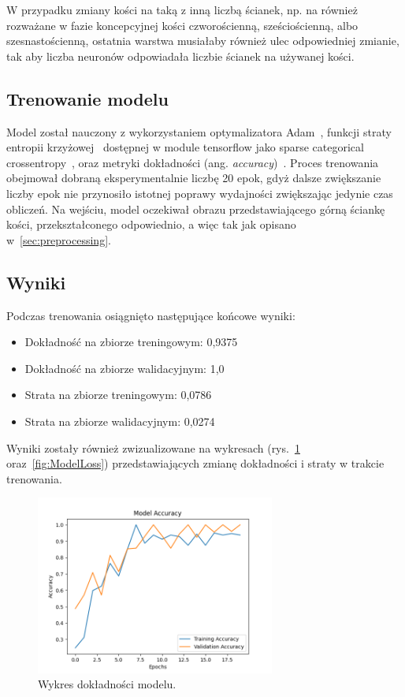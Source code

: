 W przypadku zmiany kości na taką z inną liczbą ścianek, np.
na również rozważane w fazie koncepcyjnej kości czworościenną, sześciościenną, albo szesnastościenną,
ostatnia warstwa musiałaby również ulec odpowiedniej zmianie,
tak aby liczba neuronów odpowiadała liczbie ścianek na używanej kości.

\subsection{Trenowanie modelu}\label{subsec:trenowanie-modelu}

Model został nauczony z wykorzystaniem optymalizatora Adam~\cite{kingma2014adam, keras_adam},
funkcji straty entropii krzyżowej~\cite{crossentropy} dostępnej w module tensorflow jako sparse categorical crossentropy~\cite{tensorflow_loss},
oraz metryki dokładności (ang. \textit{accuracy})~\cite{tensorflow_accuracy}.
Proces trenowania obejmował dobraną eksperymentalnie liczbę 20 epok, gdyż dalsze zwiększanie liczby epok nie przynosiło istotnej poprawy wydajności zwiększając jedynie czas obliczeń.
Na wejściu, model oczekiwał obrazu przedstawiającego górną ściankę kości, przekształconego odpowiednio, a więc tak jak opisano w~\ref{sec:preprocessing}.


\subsection{Wyniki}\label{subsec:wyniki}

Podczas trenowania osiągnięto następujące końcowe wyniki:

\begin{itemize}
    \item Dokładność na zbiorze treningowym: 0,9375
    \item Dokładność na zbiorze walidacyjnym: 1,0
    \item Strata na zbiorze treningowym: 0,0786
    \item Strata na zbiorze walidacyjnym: 0,0274
\end{itemize}

Wyniki zostały również zwizualizowane na wykresach (rys.~\ref{fig:ModelAcc} oraz~\ref{fig:ModelLoss})
przedstawiających zmianę dokładności i straty w trakcie trenowania.

\begin{figure}[H]
    \centering
    \includegraphics[width=0.7\textwidth]{chapters/04-czytanie/figures/ModelAcc1}
    \caption{Wykres dokładności modelu.}
    \label{fig:ModelAcc}
\end{figure}

